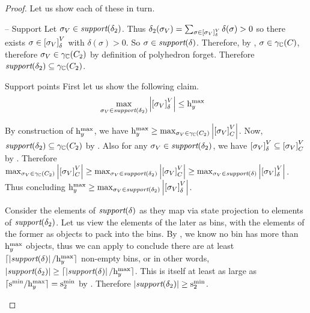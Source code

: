 \begin{proof}
Let us show each of these in turn.

\begin{subproof}{ -- Support} Let $ \sigma_V \in \textit{support}(\delta_2)
$. Thus $ \delta_2(\sigma_V)
= \sum_{\sigma \in \left[ \sigma_V \right]_{\delta}^{V}} \delta(\sigma) > 0 $ so
there exists $ \sigma \in \left[ \sigma_V \right]_{\delta}^{V} $ with
$ \delta(\sigma) > 0 $. So $ \sigma \in \textit{support}(\delta) $. Therefore,
by , $ \sigma \in \gamma_{\mathbb{C}}(C_{})
$, therefore $ \sigma_V \in \gamma_{\mathbb{C}}(C_{2}) $ by definition of
polyhedron forget. Therefore
$ \textit{support}(\delta_2) \subseteq \gamma_{\mathbb{C}}(C_{2}) $.
\end{subproof}

\begin{subproof}{ Support points} First let us
show the following claim.
\begin{align}
\label{thm:pp:forget:cond1b} & \max_{\sigma_V \in \support{\delta_2}} \setsize{\eqclass{\sigma_V}{\delta}{V}} \leq \maxh{y}
\end{align}

By construction of $ \mathrm{h}^\mathrm{max}_{y} $, we have $ \mathrm{h}^\mathrm{max}_{y} \geq \max_{\sigma_V \in \gamma_{\mathbb{C}}(C_2)} \left| \left[ \sigma_V \right]_{C}^{V} \right|
$. Now, $ \textit{support}(\delta_2) \subseteq \gamma_{\mathbb{C}}(C_{2}) $
by . Also for any
$ \sigma_V \in \textit{support}(\delta_2) $, we have
$ \left[ \sigma_V \right]_{\delta}^{V} \subseteq \left[ \sigma_V \right]_{C_{}}^{V}
$ by . Therefore
$ \max_{\sigma_V \in \gamma_{\mathbb{C}}(C_2)} \left| \left[ \sigma_V \right]_{C}^{V} \right| \geq \max_{\sigma_V \in \textit{support}(\delta_2)}\left| \left[ \sigma_V \right]_{C_{}}^{V} \right| \geq \max_{\sigma_V \in \textit{support}(\delta)} \left| \left[ \sigma_V \right]_{\delta}^{V} \right|
$. Thus concluding 
$ \mathrm{h}^\mathrm{max}_{y} \geq \max_{\sigma_V \in \textit{support}(\delta_2)} \left| \left[ \sigma_V \right]_{\delta}^{V} \right|
$.

Consider the elements of $ \textit{support}(\delta) $ as they map via state
projection to elements of $ \textit{support}(\delta_2) $. Let us view the
elements of the later as bins, with the elements of the former as
objects to pack into the bins. By , we
know no bin has more than $ \mathrm{h}^\mathrm{max}_{y} $ objects, thus we can
apply  to conclude there are at least
$ \lceil \left| \textit{support}(\delta) \right| / \mathrm{h}^\mathrm{max}_{y} \rceil $ non-empty bins, or in
other words,
$ \left| \textit{support}(\delta_2) \right| \geq \lceil \left| \textit{support}(\delta) \right|
/\mathrm{h}^\mathrm{max}_{y} \rceil $. This is itself at least as large as $ \lceil \mathrm{s}^\mathrm{min}_{}
/ \mathrm{h}^\mathrm{max}_{y} \rceil = \mathrm{s}^\mathrm{min}_{2} $ by . Therefore
$ \left| \textit{support}(\delta_2) \right| \geq \mathrm{s}^\mathrm{min}_{2} $.


\end{subproof}
\end{proof}
